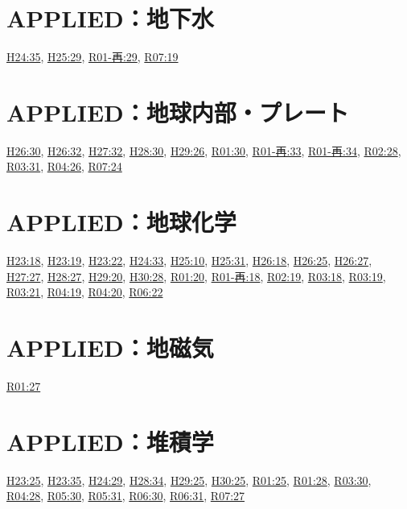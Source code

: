 \section{APPLIED：地下水}
\hyperref[q:h24-reg-applied-35]{H24:35}, \hyperref[q:h25-reg-applied-29]{H25:29}, \hyperref[q:r01-ret-applied-29]{R01-再:29}, \hyperref[q:r07-reg-applied-19]{R07:19}
\section{APPLIED：地球内部・プレート}
\hyperref[q:h26-reg-applied-30]{H26:30}, \hyperref[q:h26-reg-applied-32]{H26:32}, \hyperref[q:h27-reg-applied-32]{H27:32}, \hyperref[q:h28-reg-applied-30]{H28:30}, \hyperref[q:h29-reg-applied-26]{H29:26}, \hyperref[q:r01-reg-applied-30]{R01:30}, \hyperref[q:r01-ret-applied-33]{R01-再:33}, \hyperref[q:r01-ret-applied-34]{R01-再:34}, \hyperref[q:r02-reg-applied-28]{R02:28}, \hyperref[q:r03-reg-applied-31]{R03:31}, \hyperref[q:r04-reg-applied-26]{R04:26}, \hyperref[q:r07-reg-applied-24]{R07:24}
\section{APPLIED：地球化学}
\hyperref[q:h23-reg-applied-18]{H23:18}, \hyperref[q:h23-reg-applied-19]{H23:19}, \hyperref[q:h23-reg-applied-22]{H23:22}, \hyperref[q:h24-reg-applied-33]{H24:33}, \hyperref[q:h25-reg-applied-10]{H25:10}, \hyperref[q:h25-reg-applied-31]{H25:31}, \hyperref[q:h26-reg-applied-18]{H26:18}, \hyperref[q:h26-reg-applied-25]{H26:25}, \hyperref[q:h26-reg-applied-27]{H26:27}, \hyperref[q:h27-reg-applied-27]{H27:27}, \hyperref[q:h28-reg-applied-27]{H28:27}, \hyperref[q:h29-reg-applied-20]{H29:20}, \hyperref[q:h30-reg-applied-28]{H30:28}, \hyperref[q:r01-reg-applied-20]{R01:20}, \hyperref[q:r01-ret-applied-18]{R01-再:18}, \hyperref[q:r02-reg-applied-19]{R02:19}, \hyperref[q:r03-reg-applied-18]{R03:18}, \hyperref[q:r03-reg-applied-19]{R03:19}, \hyperref[q:r03-reg-applied-21]{R03:21}, \hyperref[q:r04-reg-applied-19]{R04:19}, \hyperref[q:r04-reg-applied-20]{R04:20}, \hyperref[q:r06-reg-applied-22]{R06:22}
\section{APPLIED：地磁気}
\hyperref[q:r01-reg-applied-27]{R01:27}
\section{APPLIED：堆積学}
\hyperref[q:h23-reg-applied-25]{H23:25}, \hyperref[q:h23-reg-applied-35]{H23:35}, \hyperref[q:h24-reg-applied-29]{H24:29}, \hyperref[q:h28-reg-applied-34]{H28:34}, \hyperref[q:h29-reg-applied-25]{H29:25}, \hyperref[q:h30-reg-applied-25]{H30:25}, \hyperref[q:r01-reg-applied-25]{R01:25}, \hyperref[q:r01-reg-applied-28]{R01:28}, \hyperref[q:r03-reg-applied-30]{R03:30}, \hyperref[q:r04-reg-applied-28]{R04:28}, \hyperref[q:r05-reg-applied-30]{R05:30}, \hyperref[q:r05-reg-applied-31]{R05:31}, \hyperref[q:r06-reg-applied-30]{R06:30}, \hyperref[q:r06-reg-applied-31]{R06:31}, \hyperref[q:r07-reg-applied-27]{R07:27}
